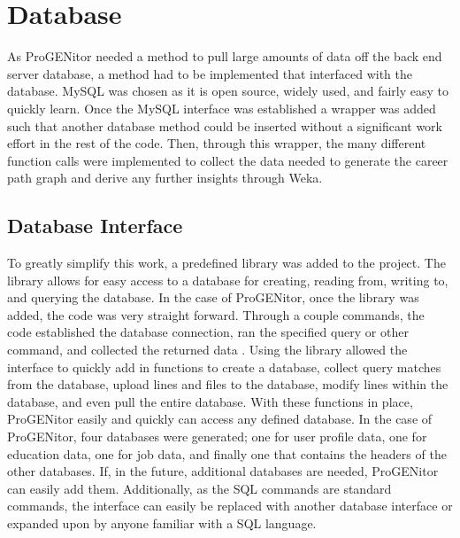 \section{Database}
\label{sect:database}
As ProGENitor needed a method to pull large amounts of data off the back end
server database, a method had to be implemented that interfaced with
the database.  MySQL was chosen as it is open source, widely used, and fairly
easy to quickly learn.  Once the MySQL interface was established a wrapper was
added such that another database method could be inserted without a significant
work effort in the rest of the code.  Then, through this wrapper, the many
different function calls were implemented to collect the data needed to generate
the career path graph and derive any further insights through Weka.

\subsection{Database Interface}
To greatly simplify this work, a predefined library was added to the project.  The 
library allows for easy access to a database for creating, reading from,
writing to, and querying the database.  In the case of ProGENitor, once the
library was added, the code was very straight forward.  Through a couple
commands, the code established the database connection, ran the specified query
or other command, and collected the returned data \cite{sqlite}.  Using the
library allowed the interface to quickly add in functions to create
a database, collect query matches from the database, upload lines and files to
the database, modify lines within the database, and even pull the entire
database.  With these functions in place, ProGENitor easily and quickly can
access any defined database.  In the case of ProGENitor, four databases were
generated; one for user profile data, one for education data, one for job data,
and finally one that contains the headers of the other databases.  If, in the
future, additional databases are needed, ProGENitor can easily add them. 
Additionally, as the SQL commands are standard commands, the interface can
easily be replaced with another database interface or expanded upon by anyone
familiar with a SQL language.

